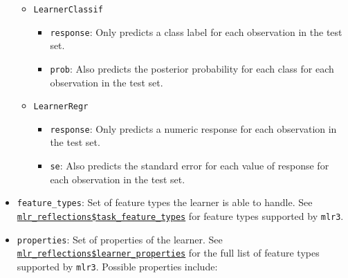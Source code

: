 \documentclass[
]{scrbook}
\providecommand{\tightlist}{%
  \setlength{\itemsep}{0pt}\setlength{\parskip}{0pt}}
\begin{document}
\begin{itemize}
  \begin{itemize}
  \tightlist
  \item
    \texttt{LearnerClassif}

    \begin{itemize}
    \tightlist
    \item
      \texttt{response}: Only predicts a class label for each observation in the test set.
    \item
      \texttt{prob}: Also predicts the posterior probability for each class for each observation in the test set.
    \end{itemize}
  \item
    \texttt{LearnerRegr}

    \begin{itemize}
    \tightlist
    \item
      \texttt{response}: Only predicts a numeric response for each observation in the test set.
    \item
      \texttt{se}: Also predicts the standard error for each value of response for each observation in the test set.
    \end{itemize}
  \end{itemize}
\item
  \texttt{feature\_types}: Set of feature types the learner is able to handle.
  See \href{https://mlr3.mlr-org.com/reference/mlr_reflections.html}{\texttt{mlr\_reflections\$task\_feature\_types}} for feature types supported by \texttt{mlr3}.
\item
  \texttt{properties}: Set of properties of the learner. See \href{https://mlr3.mlr-org.com/reference/mlr_reflections.html}{\texttt{mlr\_reflections\$learner\_properties}} for the full list of feature types supported by \texttt{mlr3}. Possible properties include:


\end{itemize}
\end{document}
